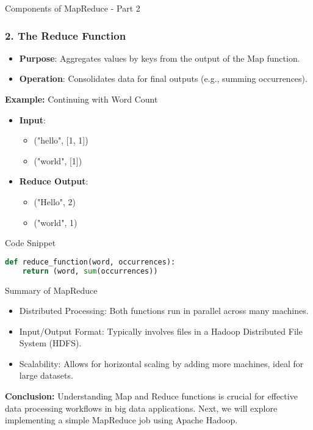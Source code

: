 \documentclass[aspectratio=169]{beamer}
\begin{document}
\begin{frame}[fragile]{Components of MapReduce - Part 2}
    \frametitle{2. The Reduce Function}
    \begin{itemize}
        \item \textbf{Purpose}: Aggregates values by keys from the output of the Map function.
        \item \textbf{Operation}: Consolidates data for final outputs (e.g., summing occurrences).
    \end{itemize}
    
    \textbf{Example:} Continuing with Word Count
    \begin{itemize}
        \item \textbf{Input}:
        \begin{itemize}
            \item ("hello", [1, 1])
            \item ("world", [1])
        \end{itemize}
        \item \textbf{Reduce Output}:
        \begin{itemize}
            \item ("Hello", 2)
            \item ("world", 1)
        \end{itemize}
    \end{itemize}

    \begin{block}{Code Snippet}
        \begin{lstlisting}[language=Python]
def reduce_function(word, occurrences):
    return (word, sum(occurrences))
        \end{lstlisting}
    \end{block}
\end{frame}

\begin{frame}{Summary of MapReduce}
    \begin{itemize}
        \item Distributed Processing: Both functions run in parallel across many machines.
        \item Input/Output Format: Typically involves files in a Hadoop Distributed File System (HDFS).
        \item Scalability: Allows for horizontal scaling by adding more machines, ideal for large datasets.
    \end{itemize}
    
    \textbf{Conclusion:} Understanding Map and Reduce functions is crucial for effective data processing workflows in big data applications. Next, we will explore implementing a simple MapReduce job using Apache Hadoop.
\end{frame}
\end{document}
